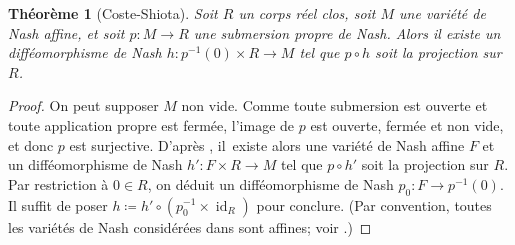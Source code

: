 \documentclass[11pt]{article}
\newtheorem{thm}{Théorème}[section]
\theoremstyle{definition}
\newcommand{\on}[1]{\operatorname{#1}}
\begin{document}
\begin{thm}[Coste-Shiota]\label{coste-shiota-thom}
Soit $R$ un corps réel clos, soit $M$ une variété de Nash affine, et soit $p\colon M\to R$ une submersion propre de Nash. Alors il existe un difféomorphisme de Nash $h\colon p^{-1}(0)\times R\to M$ tel que $p\circ h$ soit la projection sur $R$.
\end{thm}

\begin{proof}
On peut supposer $M$ non vide. Comme toute submersion est ouverte et toute application propre est fermée, l'image de $p$ est ouverte, fermée et non vide, et donc $p$ est surjective. D'après \cite[Th.\,A, Th.\,2.4(iii')]{coste1992nash}, il~existe alors une variété de Nash affine $F$ et un difféomorphisme de Nash $h'\colon F\times R\to M$ tel que $p\circ h'$ soit la projection sur $R$. Par restriction à $0\in R$, on déduit un difféomorphisme de Nash $p_0\colon F\to p^{-1}(0)$. Il suffit de poser $h\coloneqq h'\circ (p_0^{-1}\times \on{id}_R)$ pour conclure. (Par convention, toutes les variétés de Nash considérées dans \cite{coste1992nash} sont affines; voir \cite[p.\,351]{coste1992nash}.)
\end{proof}
\end{document}
